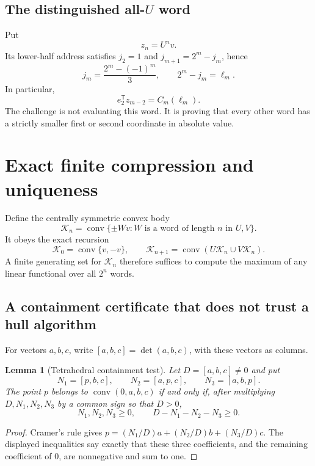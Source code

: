\documentclass[11pt,a4paper]{article}
\newtheorem{lemma}[theorem]{Lemma}
\theoremstyle{definition}\newtheorem{definition}[theorem]{Definition}
\theoremstyle{remark}\newtheorem{remark}[theorem]{Remark}
\newcommand{\conv}{\operatorname{conv}}
\newcommand{\tr}{\mathsf T}
\newcommand{\cK}{\mathcal K}
\begin{document}
\subsection{The distinguished all-\texorpdfstring{$U$}{U} word}
Put
\begin{equation}
 z_n=U^n v.
 \label{eq:orbit}
\end{equation}
Its lower-half address satisfies $j_2=1$ and $j_{m+1}=2^m-j_m$, hence
\begin{equation}
 j_m=\frac{2^m-(-1)^m}{3},\qquad 2^m-j_m=\ell_m.
 \label{eq:address}
\end{equation}
In particular,
\begin{equation}
 e_2^\tr z_{m-2}=C_m(\ell_m).
 \label{eq:all-u-correlation}
\end{equation}
The challenge is not evaluating this word. It is proving that every other
word has a strictly smaller first or second coordinate in absolute value.

\section{Exact finite compression and uniqueness}
\label{sec:finite}

Define the centrally symmetric convex body
\begin{equation}
 \cK_n=\conv\{\pm Wv: W\text{ is a word of length }n\text{ in }U,V\}.
 \label{eq:K}
\end{equation}
It obeys the exact recursion
\begin{equation}
 \cK_0=\conv\{v,-v\},\qquad
 \cK_{n+1}=\conv(U\cK_n\cup V\cK_n).
 \label{eq:Krec}
\end{equation}
A finite generating set for $\cK_n$ therefore suffices to compute the maximum
of any linear functional over all $2^n$ words.

\subsection{A containment certificate that does not trust a hull algorithm}
For vectors $a,b,c$, write $[a,b,c]=\det(a,b,c)$, with these vectors as columns.

\begin{lemma}[Tetrahedral containment test]
\label{lem:tetra}
Let $D=[a,b,c]\ne0$ and put
\[
 N_1=[p,b,c],\qquad N_2=[a,p,c],\qquad N_3=[a,b,p].
\]
The point $p$ belongs to $\conv(0,a,b,c)$ if and only if, after multiplying
$D,N_1,N_2,N_3$ by a common sign so that $D>0$,
\begin{equation}
 N_1,N_2,N_3\ge0,\qquad D-N_1-N_2-N_3\ge0.
 \label{eq:tetra}
\end{equation}
\end{lemma}
\begin{proof}
Cramer's rule gives
$p=(N_1/D)a+(N_2/D)b+(N_3/D)c$. The displayed inequalities say exactly that
these three coefficients, and the remaining coefficient of $0$, are
nonnegative and sum to one.
\end{proof}
\end{document}
